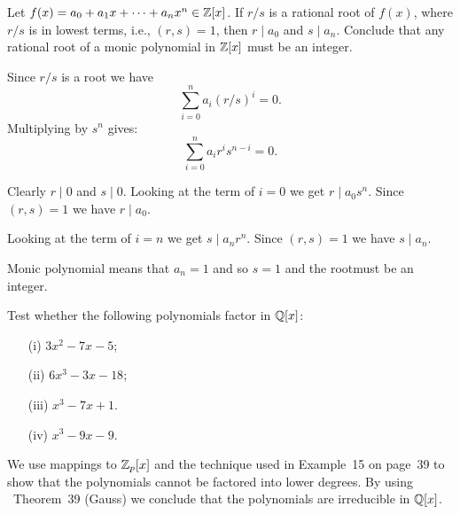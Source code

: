 \begin{myenumerate}

\item
\begin{excopy}
Let \label{ex:QZx:rs}
\(f(x)= a_0+a_1x+\cdots + a_nx^n\in\mathbb{Z}[x]\).
If \(r/s\) is a rational root of \(f(x)\), where \(r/s\)
is in lowest terms, i.e., \((r,s)=1\),
then \(r\mid a_0\) and \(s\mid a_n\).
Conclude that any rational root of a monic polynomial in \(\mathbb{Z}[x]\)
must be an integer.
\end{excopy}

Since \(r/s\) is a root we have
\begin{equation*}
\sum_{i=0}^n a_i(r/s)^i = 0.
\end{equation*}
Multiplying by \(s^n\) gives:
\begin{equation*}
\sum_{i=0}^n a_i r^i s^{n-i} = 0.
\end{equation*}

Clearly \(r\mid 0\) and \(s\mid 0\).
Looking at the term of \(i=0\) we get \(r\mid a_0 s^n\).
Since \((r,s)=1\) we have \(r\mid a_0\).

Looking at the term of \(i=n\) we get \(s\mid a_n r^n\).
Since \((r,s)=1\) we have \(s\mid a_n\).

Monic polynomial means that \(a_n=1\) and so \(s=1\)
and the rootmust be an integer.

\item
\begin{excopy}
Test
\label{ex:4polys:inQ}
whether the following polynomials factor in \(\mathbb{Q}[x]\):
\begin{itemize}
 \item[(i)]   \(3x^2-7x-5\);
 \item[(ii)]  \(6x^3-3x-18\);
 \item[(iii)] \(x^3-7x+1\).
 \item[(iv)]  \(x^3-9x-9\).
\end{itemize}
\end{excopy}

We use mappings to \(\mathbb{Z}_p[x]\) and the technique used in
\cite{Rotman98} Example~15 on page~39
to show that the polynomials cannot be factored into
lower degrees.
By using
\cite{Rotman98}~Theorem~39 (Gauss) we conclude
that the polynomials are irreducible in \(\mathbb{Q}[x]\).


\end{myenumerate}
